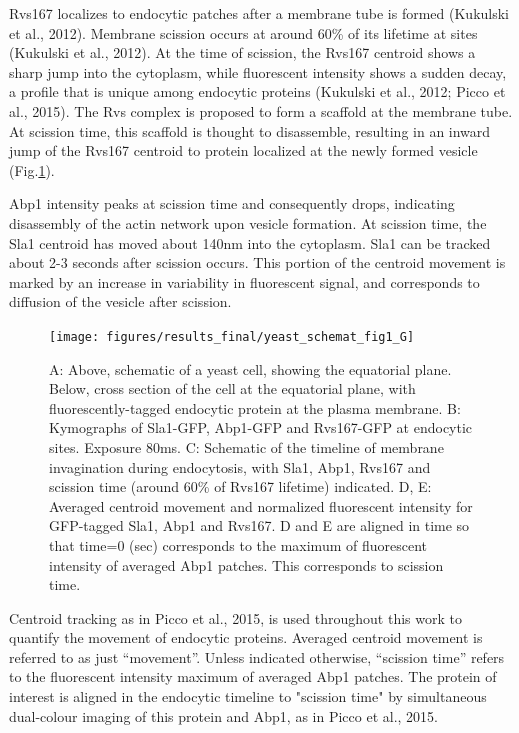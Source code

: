 \vspace{5mm}
Rvs167 localizes to endocytic patches after a membrane tube is formed (Kukulski et al., 2012). Membrane scission occurs at around 60\% of its lifetime at sites (Kukulski et al., 2012). At the time of scission, the Rvs167 centroid shows a sharp jump into the cytoplasm, while fluorescent intensity shows a sudden decay, a profile that is unique among endocytic proteins (Kukulski et al., 2012; Picco et al., 2015). The Rvs complex is proposed to form a scaffold at the membrane tube. At scission time, this scaffold is thought to disassemble, resulting in an inward jump of the Rvs167 centroid to protein localized at the newly formed vesicle (Fig.\ref{fig1_schematic}). 

\vspace{5mm}
Abp1 intensity peaks at scission time and consequently drops, indicating disassembly of the actin network upon vesicle formation. At scission time, the Sla1 centroid has moved about 140nm into the cytoplasm. Sla1 can be tracked about 2-3 seconds after scission occurs. This portion of the centroid movement is marked by an increase in variability in fluorescent signal, and corresponds to diffusion of the vesicle after scission.




	\begin{figure}[H]
	\centering
	\hspace*{-1.8cm}%
	\texttt{[image: figures/results\_final/yeast\_schemat\_fig1\_G]}
	\caption[Tracking yeast endocytic proteins]
	{A: Above, schematic of a yeast cell, showing the equatorial plane. Below, cross section of the cell at the equatorial plane, with fluorescently-tagged endocytic protein at the plasma membrane. 
B: Kymographs of Sla1-GFP, Abp1-GFP and Rvs167-GFP at endocytic sites. Exposure 80ms.
C: Schematic of the timeline of membrane invagination during endocytosis, with Sla1, Abp1, Rvs167 and scission time (around 60\% of Rvs167 lifetime) indicated. 
D, E: Averaged centroid movement and normalized fluorescent intensity for GFP-tagged Sla1, Abp1 and Rvs167. D and E are aligned in time so that time=0 (sec) corresponds to the maximum of fluorescent intensity of averaged Abp1 patches. This corresponds to scission time.
	\label{fig1_schematic}}
	\end{figure}

\vspace{5mm}
Centroid tracking as in Picco et al., 2015, is used throughout this work to quantify the movement of endocytic proteins. Averaged centroid movement is referred to as just  “movement”. Unless indicated otherwise, “scission time” refers to the fluorescent intensity maximum of averaged Abp1 patches. The protein of interest is aligned in the endocytic timeline to "scission time" by simultaneous dual-colour imaging of this protein and Abp1, as in Picco et al., 2015.

